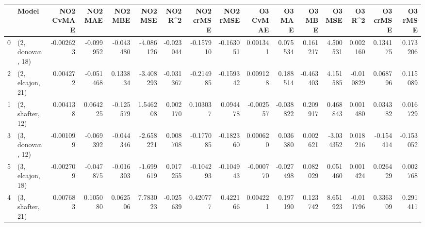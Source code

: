 \begin{tabular}{llrrrrrrrrrrrrrr}
\toprule
{} &             Model &  NO2 CvMAE &   NO2 MAE &   NO2 MBE &   NO2 MSE &   NO2 R\textasciicircum2 &  NO2 crMSE &  NO2 rMSE &  O3 CvMAE &    O3 MAE &    O3 MBE &    O3 MSE &    O3 R\textasciicircum2 &  O3 crMSE &   O3 rMSE \\
\midrule
0 &  (2, donovan, 18) &  -0.002623 & -0.099952 & -0.043480 & -4.086126 & -0.023044 &  -0.157910 & -0.163051 &  0.001341 &  0.075534 &  0.161217 &  4.500531 &  0.002160 &  0.134175 &  0.173206 \\
2 &  (2, elcajon, 21) &   0.004272 & -0.051468 &  0.133834 & -3.408293 & -0.031367 &  -0.214985 & -0.159342 &  0.009128 &  0.188514 & -0.463403 &  4.151585 & -0.010829 &  0.068796 &  0.115089 \\
1 &  (2, shafter, 12) &   0.004138 &  0.064225 & -0.125579 &  1.546208 &  0.002170 &   0.103037 &  0.094478 & -0.002557 & -0.038822 &  0.209917 &  0.468843 &  0.001480 &  0.034382 &  0.016729 \\
3 &  (3, donovan, 12) &  -0.001099 & -0.069392 & -0.044346 & -2.658221 &  0.008708 &  -0.177085 & -0.182360 &  0.000620 &  0.036380 &  0.002621 & -3.034352 &  0.018216 & -0.154414 & -0.153052 \\
5 &  (3, elcajon, 18) &  -0.002709 & -0.047875 & -0.016303 & -1.699619 &  0.017255 &  -0.104293 & -0.104943 & -0.000770 & -0.027498 &  0.082029 &  0.051460 &  0.001424 &  0.026429 &  0.002768 \\
4 &  (3, shafter, 21) &   0.007683 &  0.105080 &  0.062506 &  7.783023 & -0.025639 &   0.420777 &  0.422166 &  0.004221 &  0.197190 &  0.123742 &  8.651923 & -0.011796 &  0.336309 &  0.291411 \\
\bottomrule
\end{tabular}
